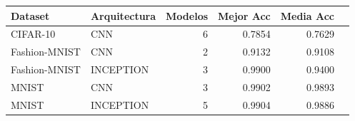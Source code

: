 \begin{tabular}{llrrrr}
\toprule
Dataset & Arquitectura & Modelos & Mejor Acc & Media Acc \\
\midrule
CIFAR-10 & CNN & 6 & 0.7854 & 0.7629 \\
Fashion-MNIST & CNN & 2 & 0.9132 & 0.9108 \\
Fashion-MNIST & INCEPTION & 3 & 0.9900 & 0.9400 \\
MNIST & CNN & 3 & 0.9902 & 0.9893 \\
MNIST & INCEPTION & 5 & 0.9904 & 0.9886 \\
\bottomrule
\end{tabular}